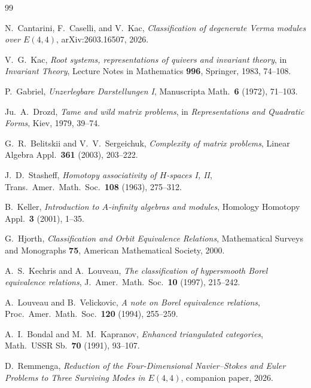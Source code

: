 \documentclass[reqno,10pt]{amsart}
\theoremstyle{plain}
\theoremstyle{definition}
\begin{document}
\begin{thebibliography}{99}

N.~Cantarini, F.~Caselli, and V.~Kac,
\emph{Classification of degenerate Verma modules over $E(4,4)$},
arXiv:2603.16507, 2026.

V.~G.~Kac,
\emph{Root systems, representations of quivers and invariant theory},
in \emph{Invariant Theory}, Lecture Notes in Mathematics \textbf{996},
Springer, 1983, 74--108.

P.~Gabriel,
\emph{Unzerlegbare Darstellungen I},
Manuscripta Math.\ \textbf{6} (1972), 71--103.

Ju.~A.~Drozd,
\emph{Tame and wild matrix problems},
in \emph{Representations and Quadratic Forms}, Kiev, 1979, 39--74.

G.~R.~Belitskii and V.~V.~Sergeichuk,
\emph{Complexity of matrix problems},
Linear Algebra Appl.\ \textbf{361} (2003), 203--222.

J.~D.~Stasheff,
\emph{Homotopy associativity of $H$-spaces I, II},
Trans.\ Amer.\ Math.\ Soc.\ \textbf{108} (1963), 275--312.

B.~Keller,
\emph{Introduction to $A$-infinity algebras and modules},
Homology Homotopy Appl.\ \textbf{3} (2001), 1--35.

G.~Hjorth,
\emph{Classification and Orbit Equivalence Relations},
Mathematical Surveys and Monographs \textbf{75},
American Mathematical Society, 2000.

A.~S.~Kechris and A.~Louveau,
\emph{The classification of hypersmooth Borel equivalence relations},
J.\ Amer.\ Math.\ Soc.\ \textbf{10} (1997), 215--242.

A.~Louveau and B.~Velickovic,
\emph{A note on Borel equivalence relations},
Proc.\ Amer.\ Math.\ Soc.\ \textbf{120} (1994), 255--259.

A.~I.~Bondal and M.~M.~Kapranov,
\emph{Enhanced triangulated categories},
Math.\ USSR Sb.\ \textbf{70} (1991), 93--107.

D.~Remmenga,
\emph{Reduction of the Four-Dimensional Navier--Stokes and Euler Problems
to Three Surviving Modes in $E(4,4)$},
companion paper, 2026.

\end{thebibliography}
\end{document}
